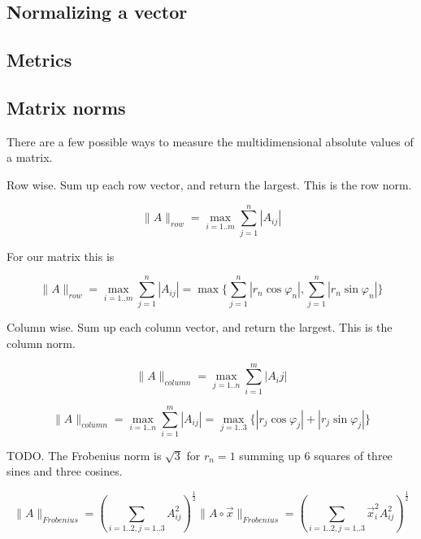 \documentclass[a4paper]{article}
\begin{document}
\subsection{Normalizing a vector}


\subsection{Metrics}


\subsection{Matrix norms}

There are a few possible ways to measure the multidimensional absolute values of a matrix.

Row wise. Sum up each row vector, and return the largest. This is the row norm.

\begin{displaymath}
\|A\|_{row} = \max_{i=1..m} { \sum_{j=1}^{n} |A_{ij}| }
\end{displaymath}

For our matrix this is

\begin{displaymath}
\|A\|_{row} = \max_{i=1..m} { \sum_{j=1}^{n} |A_{ij}| } = \max\{ \sum_{j=1}^{n} |r_n\cos\varphi_n|, \sum_{j=1}^{n} |r_n\sin\varphi_n| \}
\end{displaymath}


Column wise. Sum up each column vector, and return the largest. This is the column norm.

\begin{displaymath}
\|A\|_{column} = \max_{j=1..n} { \sum_{i=1}^{m} |A_{i}j| }
\end{displaymath}

\begin{displaymath}
\|A\|_{column} = \max_{i=1..n} { \sum_{i=1}^{m} |A_{ij}| } = \max_{j=1..3}\{ |r_j\cos\varphi_j| + |r_j\sin\varphi_j| \}
\end{displaymath}

TODO. The Frobenius norm is $\sqrt{3}$ for $r_n = 1$ summing up 6 squares of three sines and three cosines.

\begin{displaymath}
\|A\|_{Frobenius} = (\sum_{i=1..2,j=1..3}A_{ij}^{2})^{\frac12}
\|A\circ\vec{x}\|_{Frobenius} = (\sum_{i=1..2,j=1..3}\vec{x}_{i}^{2}A_{ij}^{2})^{\frac12}
\end{displaymath}
\end{document}
